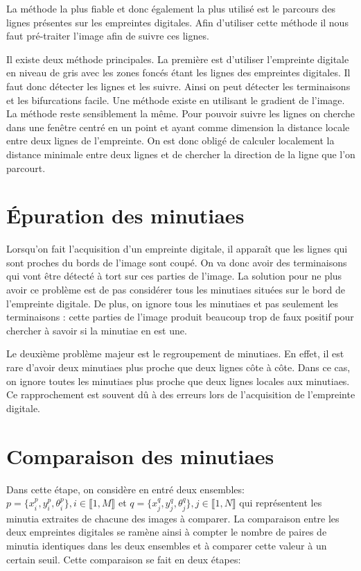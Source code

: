 \documentclass{report}
\begin{document}
La méthode la plus fiable et donc également la plus utilisé est le
parcours des lignes présentes sur les empreintes digitales. Afin
d'utiliser cette méthode il nous faut pré-traiter l'image afin de
suivre ces lignes.

Il existe deux méthode principales. La première est d'utiliser
l'empreinte digitale en niveau de gris avec les zones foncés étant les
lignes des empreintes digitales. Il faut donc détecter les lignes et
les suivre. Ainsi on peut détecter les terminaisons et les
bifurcations facile. Une méthode existe en utilisant le gradient de
l'image. La méthode reste sensiblement la même. Pour pouvoir suivre
les lignes on cherche dans une fenêtre centré en un point et ayant
comme dimension la distance locale entre deux lignes de
l'empreinte. On est donc obligé de calculer localement la distance
minimale entre deux lignes et  de chercher la direction de la ligne
que l'on parcourt.

\section{Épuration des minutiaes}

Lorsqu'on fait l'acquisition d'un empreinte digitale, il apparaît que
les lignes qui sont proches du bords de l'image sont coupé. On va donc
avoir des terminaisons qui vont être détecté à tort sur ces parties de
l'image. La solution pour ne plus avoir ce problème est de pas
considérer tous les minutiaes situées sur le bord de l'empreinte
digitale. De plus, on ignore tous les minutiaes et pas seulement les
terminaisons : cette parties de l'image produit beaucoup trop de faux
positif pour chercher à savoir si la minutiae en est une.

Le deuxième problème majeur est le regroupement de minutiaes. En
effet, il est rare d'avoir deux minutiaes plus proche que deux lignes
côte à côte. Dans ce cas, on ignore toutes les minutiaes plus proche
que deux lignes locales aux minutiaes. Ce rapprochement est souvent
dû à des erreurs lors de l'acquisition de l'empreinte digitale.

\section{Comparaison des minutiaes}

Dans cette étape, on considère en entré deux ensembles: $p =
\{x_{i}^{p}, y_{i}^{p}, \theta_{i}^{p}\}, i \in \llbracket 1, M
\rrbracket$ et $q = \{x_{j}^{q}, y_{j}^{q}, \theta_{j}^{q}\}, j \in
\llbracket 1, N \rrbracket$ qui représentent les minutia extraites de
chacune des images à comparer. La comparaison entre les deux
empreintes digitales se ramène ainsi à compter le nombre de paires de
minutia identiques dans les deux ensembles et à comparer cette valeur
à un certain seuil. Cette comparaison se fait en deux étapes:
\end{document}
